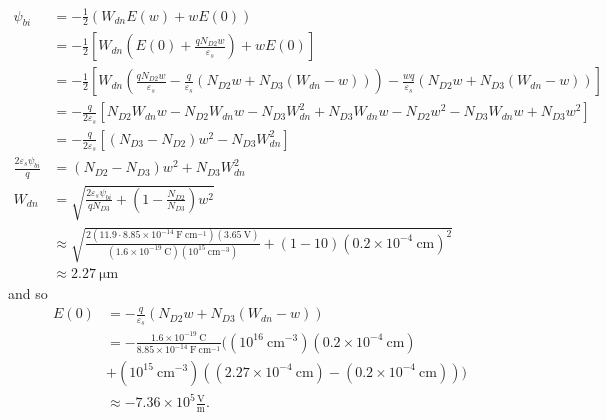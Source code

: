 \documentclass{article}
\begin{document}
\begin{align*}
\psi_{bi} &= -\frac{1}{2}(W_{dn} E(w) + w E(0)) \\
          &= -\frac{1}{2}\left[W_{dn}\left(E(0) + \frac{q N_{D2} w}{\varepsilon_s}\right)
                             + w E(0)\right] \\
          &= -\frac{1}{2}\left[W_{dn}\left(\frac{q N_{D2} w}{\varepsilon_s}
                             - \frac{q}{\varepsilon_s}(N_{D2} w + N_{D3}(W_{dn} - w))\right)
                             - \frac{w q}{\varepsilon_s}(N_{D2} w + N_{D3}(W_{dn} - w))\right] \\
          &= -\frac{q}{2\varepsilon_s}\left[N_{D2} W_{dn} w
                                          - N_{D2} W_{dn} w
                                          - N_{D3} W_{dn}^2
                                          + N_{D3} W_{dn} w
                                          - N_{D2} w^2 
                                          - N_{D3} W_{dn} w
                                          + N_{D3} w^2\right] \\
          &= -\frac{q}{2\varepsilon_s}\left[(N_{D3} - N_{D2}) w^2 - N_{D3} W_{dn}^2\right] \\
\frac{2 \varepsilon_s \psi_{bi}}{q} &= (N_{D2} - N_{D3}) w^2 + N_{D3} W_{dn}^2 \\
W_{dn} &= \sqrt{\frac{2 \varepsilon_s \psi_{bi}}{q N_{D3}} 
                + \left(1 - \frac{N_{D2}}{N_{D3}}\right) w^2} \\
       &\approx \sqrt{\frac{2 (11.9 \cdot 8.85 \times 10^{-14} ~\mathrm{F}~\mathrm{cm}^{-1})
                              (3.65 ~\mathrm{V})}
                           {(1.6 \times 10^{-19} ~\mathrm{C})
                            (10^{15} ~\mathrm{cm}^{-3})}
                     + (1 - 10)(0.2 \times 10^{-4} ~\mathrm{cm})^2} \\
       &\approx 2.27 ~\mathrm{\mu m}
\end{align*}
and so
\begin{align*}
E(0) &= -\frac{q}{\varepsilon_s} (N_{D2} w + N_{D3} (W_{dn} - w)) \\
     &= -\frac{1.6 \times 10^{-19} ~\mathrm{C}}
              {8.85 \times 10^{-14} ~\mathrm{F}~\mathrm{cm}^{-1}}
              ((10^{16} ~\mathrm{cm}^{-3})(0.2 \times 10^{-4} ~\mathrm{cm}) \\
           &+  (10^{15} ~\mathrm{cm}^{-3})
               ((2.27 \times 10^{-4} ~\mathrm{cm}) - (0.2 \times 10^{-4} ~\mathrm{cm}))) \\
     &\approx -7.36 \times 10^{5} \frac{\mathrm{V}}{\mathrm{m}}.
\end{align*}
\end{document}
